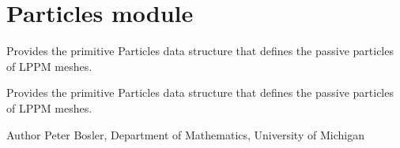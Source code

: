 \hypertarget{group__Particles}{\section{Particles module}
\label{group__Particles}
}


Provides the primitive Particles data structure that defines the passive particles of L\+P\+P\+M meshes.  


Provides the primitive Particles data structure that defines the passive particles of L\+P\+P\+M meshes. 

\begin{DoxyAuthor}{Author}
Peter Bosler, Department of Mathematics, University of Michigan 
\end{DoxyAuthor}
